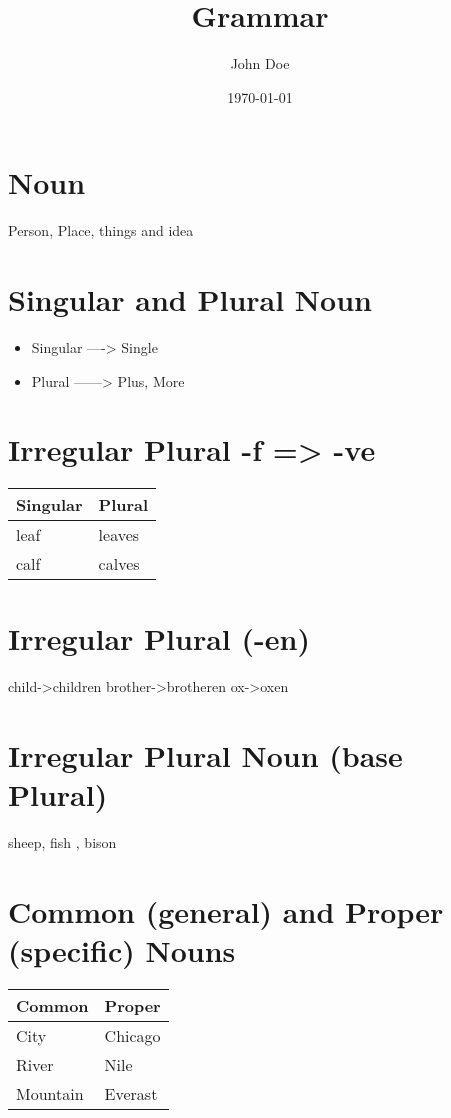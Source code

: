 \documentclass[11pt]{article}
\author{John Doe}
\date{\today}
\title{Grammar}
\begin{document}
\maketitle
\tableofcontents


\section{Noun}
\label{sec:org469f81b}
Person, Place, things and idea

\section{Singular and Plural Noun}
\label{sec:org8f25742}
\begin{itemize}
\item Singular ----> Single
\item Plural ------> Plus, More
\end{itemize}

\section{Irregular Plural -f  => -ve}
\label{sec:org899e6b2}
\begin{center}
\begin{tabular}{ll}
Singular & Plural\\
\hline
leaf & leaves\\
calf & calves\\
\end{tabular}
\end{center}

\section{Irregular Plural (-en)}
\label{sec:orga9d12f8}
child->children
brother->brotheren
ox->oxen
\section{Irregular Plural Noun (base Plural)}
\label{sec:org2b892e6}
sheep, fish , bison

\section{Common (general) and Proper (specific) Nouns}
\label{sec:orgdf5b941}
\begin{center}
\begin{tabular}{ll}
Common & Proper\\
\hline
City & Chicago\\
River & Nile\\
Mountain & Everast\\
\end{tabular}
\end{center}
\end{document}
